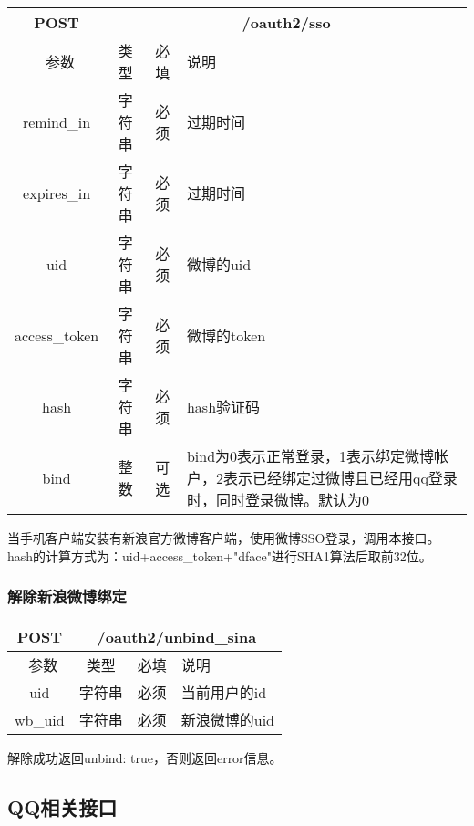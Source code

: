 \begin{table}[H]
   \begin{center}
\begin{tabular}{|c|c|c|p{12cm}|}
\hline
POST & \multicolumn{3}{|c|}{/oauth2/sso} \\
\hline\hline
 \  参数  & 类型 & 必填 &  说明  \\
\hline
 remind\_in  & 字符串 & 必须 &  过期时间\\
 \hline
 expires\_in  & 字符串 & 必须 &  过期时间\\
  \hline
 uid  & 字符串 & 必须 &  微博的uid\\
  \hline
 access\_token  & 字符串 & 必须 &  微博的token\\
 \hline
 hash  & 字符串 & 必须 &  hash验证码\\
\hline
 bind  & 整数 & 可选 &  bind为0表示正常登录，1表示绑定微博帐户，2表示已经绑定过微博且已经用qq登录时，同时登录微博。默认为0\\
\hline
\end{tabular}
   \end{center}
\end{table}
当手机客户端安装有新浪官方微博客户端，使用微博SSO登录，调用本接口。
hash的计算方式为：uid+access\_token+"dface"进行SHA1算法后取前32位。

\subsubsection{解除新浪微博绑定}

\begin{table}[H]
   \begin{center}
\begin{tabular}{|c|c|c|p{12cm}|}
\hline
POST & \multicolumn{3}{|c|}{/oauth2/unbind\_sina} \\
\hline\hline
 \  参数  & 类型 & 必填 &  说明  \\
\hline
    uid  & 字符串 & 必须 &  当前用户的id\\
\hline
    wb\_uid  & 字符串 & 必须 &  新浪微博的uid\\    
\hline
\end{tabular}
   \end{center}
\end{table}
解除成功返回{unbind: true}，否则返回error信息。



\subsection{QQ相关接口}
